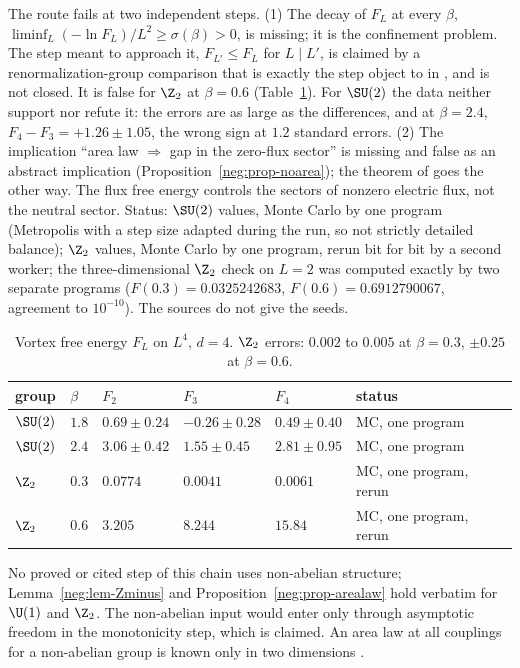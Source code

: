 \begin{observation}\label{neg:obs-vort}
The route fails at two independent steps.
\textup{(1)} The decay of $F_L$ at every $\beta$, $\liminf_L(-\ln F_L)/L^2\ge\sigma(\beta)>0$, is
missing; it is the confinement problem. The step meant to approach it, $F_{L'}\le F_L$ for
$L\mid L'$, is claimed by a renormalization-group comparison that is exactly the step
\cite{IS07,IS08} object to in \cite{To07}, and is not closed. It is false for $\Z_2$ at
$\beta=0.6$ (Table~\ref{neg:tab-vort}). For $\SU(2)$ the data neither support nor refute it:
the errors are as large as the differences, and at $\beta=2.4$,
$F_4-F_3=+1.26\pm1.05$, the wrong sign at $1.2$ standard errors.
\textup{(2)} The implication ``area law $\Rightarrow$ gap in the zero-flux sector'' is missing
and false as an abstract implication (Proposition~\ref{neg:prop-noarea}); the theorem of
\cite{Ch21} goes the other way. The flux free energy controls the sectors of nonzero electric
flux, not the neutral sector.
Status: $\SU(2)$ values, Monte Carlo by one program (Metropolis with a step size adapted during
the run, so not strictly detailed balance); $\Z_2$ values, Monte Carlo by one program, rerun bit
for bit by a second worker; the three-dimensional $\Z_2$ check on $L=2$ was computed exactly by
two separate programs ($F(0.3)=0.0325242683$, $F(0.6)=0.6912790067$, agreement to $10^{-10}$).
The sources do not give the seeds.
\end{observation}

\begin{table}[ht]
\centering
\small
\begin{tabular}{@{}llllll@{}}
\toprule
group & $\beta$ & $F_2$ & $F_3$ & $F_4$ & status \\
\midrule
$\SU(2)$ & $1.8$ & $0.69\pm0.24$ & $-0.26\pm0.28$ & $0.49\pm0.40$ & MC, one program \\
$\SU(2)$ & $2.4$ & $3.06\pm0.42$ & $1.55\pm0.45$ & $2.81\pm0.95$ & MC, one program \\
$\Z_2$ & $0.3$ & $0.0774$ & $0.0041$ & $0.0061$ & MC, one program, rerun \\
$\Z_2$ & $0.6$ & $3.205$ & $8.244$ & $15.84$ & MC, one program, rerun \\
\bottomrule
\end{tabular}
\caption{Vortex free energy $F_L$ on $L^4$, $d=4$. $\Z_2$ errors: $0.002$ to $0.005$ at
$\beta=0.3$, $\pm0.25$ at $\beta=0.6$.}
\label{neg:tab-vort}
\end{table}

No proved or cited step of this chain uses non-abelian structure; Lemma~\ref{neg:lem-Zminus}
and Proposition~\ref{neg:prop-arealaw} hold verbatim for $\U(1)$ and $\Z_2$. The non-abelian
input would enter only through asymptotic freedom in the monotonicity step, which is claimed.
An area law at all couplings for a non-abelian group is known only in two dimensions
\cite[p.~8]{Ch18}.

